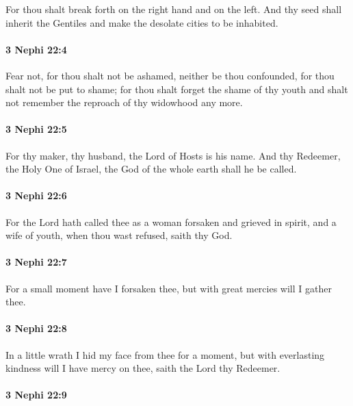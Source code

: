 			For thou shalt break forth on the right hand and on the left.
			And thy seed shall inherit the Gentiles
			and make the desolate cities to be inhabited.

		\paragraph{3 Nephi 22:4} %
			\label{3NEPHI-22-4}

			Fear not, for thou shalt not be ashamed,
			neither be thou confounded,
			for thou shalt not be put to shame;
			for thou shalt forget the shame of thy youth
			and shalt not remember the reproach of thy widowhood any more.

		\paragraph{3 Nephi 22:5} %
			\label{3NEPHI-22-5}

			For thy maker, thy husband, the Lord of Hosts is his name.
			And thy Redeemer, the Holy One of Israel,
			the God of the whole earth shall he be called.

		\paragraph{3 Nephi 22:6} %
			\label{3NEPHI-22-6}

			For the Lord hath called thee
			as a woman forsaken and grieved in spirit,
			and a wife of youth,
			when thou wast refused, saith thy God.

		\paragraph{3 Nephi 22:7} %
			\label{3NEPHI-22-7}

			For a small moment have I forsaken thee,
			but with great mercies will I gather thee.

		\paragraph{3 Nephi 22:8} %
			\label{3NEPHI-22-8}

			In a little wrath I hid my face from thee for a moment,
			but with everlasting kindness will I have mercy on thee,
			saith the Lord thy Redeemer.

		\paragraph{3 Nephi 22:9} %
			\label{3NEPHI-22-9}

